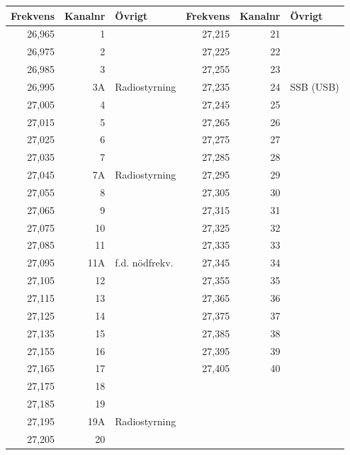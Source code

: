 \begin{longtable}{rrl|rrl}
	\textbf{Frekvens}& \textbf{Kanalnr}& \textbf{Övrigt}
	& \textbf{Frekvens} & \textbf{Kanalnr} & \textbf{Övrigt}  \\
	\hline \endhead
	  26,965 &       1 &                &   27,215 &      21 &           \\
	  26,975 &       2 &                &   27,225 &      22 &           \\
	  26,985 &       3 &                &   27,255 &      23 &           \\
	  26,995 &      3A & Radiostyrning  &   27,235 &      24 & SSB (USB) \\
	  27,005 &       4 &                &   27,245 &      25 &           \\
	  27,015 &       5 &                &   27,265 &      26 &           \\
	  27,025 &       6 &                &   27,275 &      27 &           \\
	  27,035 &       7 &                &   27,285 &      28 &           \\
	  27,045 &      7A & Radiostyrning  &   27,295 &      29 &           \\
	  27,055 &       8 &                &   27,305 &      30 &           \\
	  27,065 &       9 &                &   27,315 &      31 &           \\
	  27,075 &      10 &                &   27,325 &      32 &           \\
	  27,085 &      11 &                &   27,335 &      33 &           \\
	  27,095 &     11A & f.d. nödfrekv. &   27,345 &      34 &           \\
	  27,105 &      12 &                &   27,355 &      35 &           \\
	  27,115 &      13 &                &   27,365 &      36 &           \\
	  27,125 &      14 &                &   27,375 &      37 &           \\
	  27,135 &      15 &                &   27,385 &      38 &           \\
	  27,155 &      16 &                &   27,395 &      39 &           \\
	  27,165 &      17 &                &   27,405 &      40 &           \\
	  27,175 &      18 &                &          &         &           \\
	  27,185 &      19 &                &          &         &           \\
	  27,195 &     19A & Radiostyrning  &          &         &           \\
	  27,205 &      20 &                &          &         &
\end{longtable}

